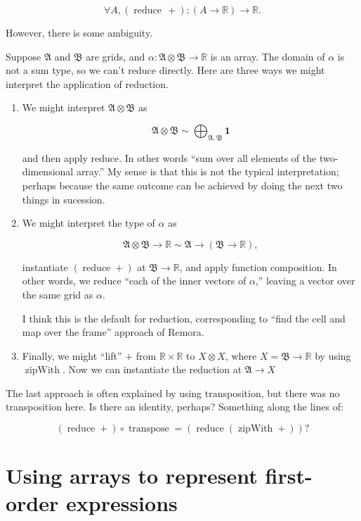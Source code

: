 \documentclass[11pt]{article}
\newcommand{\gr}[1]{\mathfrak{#1}}
\newcommand{\R}{\mathbb{R}}
\newcommand{\unit}{\mathbf{1}}
\DeclareMathOperator{\reduce}{reduce}
\DeclareMathOperator{\zipWith}{zipWith}
\begin{document}
$$
\forall A, (\operatorname{reduce}\, +) : (A \to \R)\to \R.
$$

However, there is some ambiguity. 

Suppose \(\gr{A}\) and \(\gr{B}\) are grids, and \(\alpha : \gr{A}\otimes\gr{B}\to\R\)
is an array. The domain of \(\alpha\) is not a sum type, so we can't reduce
directly. Here are three ways we might interpret the application of reduction. 

\begin{enumerate}
\item We might interpret \(\gr{A}\otimes\gr{B}\) as 

$$
   \gr{A}\otimes\gr{B} \sim \bigoplus_{\gr{A}, \gr{B}} \unit  
   $$

and then apply reduce. In other words “sum over all elements of the
two-dimensional array.” My sense is that this is not the typical
interpretation; perhaps because the same outcome can be achieved by doing the
next two things in sucession.

\item We might interpret the type of \(\alpha\) as

$$
   \gr{A}\otimes\gr{B}\to\R \sim \gr{A} \to (\gr{B}\to \R),
   $$

instantiate \((\reduce +)\) at \(\gr{B}\to\R\), and apply function
composition. In other words, we reduce “each of the inner vectors of
\(\alpha\),” leaving a vector over the same grid as \(\alpha\).

I think this is the default for reduction, corresponding to “find the cell
and map over the frame” approach of Remora.

\item Finally, we might “lift” \(+\) from \(\R\times \R\) to \(X\otimes X\), where \(X =
   \gr{B}\to\R\) by using \(\zipWith\). Now we can instantiate the reduction at
\(\gr{A}\to X\)
\end{enumerate}

The last approach is often explained by using transposition, but there was no
transposition here. Is there an identity, perhaps? Something along the lines of:

$$
(\reduce +) \circ \operatorname{transpose} = (\reduce (\zipWith +)) ? 
$$

\section{Using arrays to represent first-order expressions}
\label{sec:orgac340af}
\end{document}
